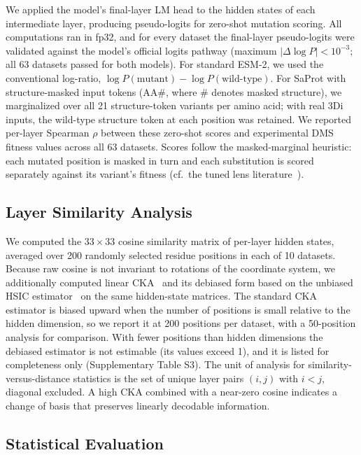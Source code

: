 \documentclass[numbered,webpdf,modern,large]{oup-authoring-template}
\newcommand{\rone}[1]{#1}
\newcommand{\rtwo}[1]{#1}
\newcommand{\rthree}[1]{#1}
\begin{document}
\rone{We applied the model's final-layer LM head to the hidden states of each
intermediate layer, producing pseudo-logits for zero-shot mutation scoring. All
computations ran in fp32, and for every dataset the final-layer pseudo-logits were
validated against the model's official logits pathway (maximum $|\Delta \log P| <
10^{-3}$; all 63 datasets passed for both models). For standard ESM-2, we used the
conventional log-ratio, $\log P(\text{mutant}) - \log P(\text{wild-type})$. For SaProt
with structure-masked input tokens ($\text{AA}\#$, where $\#$ denotes masked
structure), we marginalized over all 21 structure-token variants per amino acid; with
real 3Di inputs, the wild-type structure token at each position was retained. We
reported per-layer Spearman $\rho$ between these zero-shot scores and experimental
DMS fitness values across all 63 datasets. \rtwo{Scores follow the masked-marginal
heuristic: each mutated position is masked in turn and each substitution is scored
separately against its variant's fitness (cf.\ the tuned lens
literature~\cite{belrose2023eliciting}).}}

\subsection{Layer Similarity Analysis}

\rone{We computed the $33 \times 33$ cosine similarity matrix of per-layer hidden states,
averaged over \rthree{200 randomly selected residue positions in each of} 10 datasets. Because raw
cosine is not invariant to rotations of the coordinate system, we additionally computed
linear CKA~\cite{kornblith2019similarity} \rtwo{and its debiased form based on the
unbiased HSIC estimator~\cite{song2012feature}} on the same hidden-state matrices.
\rthree{The standard CKA estimator is biased upward when the number of positions is
small relative to the hidden dimension, so we report it at 200 positions per dataset,
with a 50-position analysis for comparison. With fewer positions than hidden dimensions
the debiased estimator is not estimable (its values exceed 1), and it is listed for
completeness only (Supplementary Table S3).} The unit
of analysis for similarity-versus-distance statistics is the set of unique layer pairs
$(i, j)$ with $i < j$, diagonal excluded. A high CKA combined with a near-zero cosine
indicates a change of basis that preserves linearly decodable information.}

\subsection{Statistical Evaluation}
\end{document}
